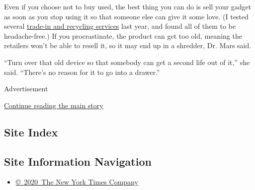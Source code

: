 Even if you choose not to buy used, the best thing you can do is sell
your gadget as soon as you stop using it so that someone else can give
it some love. (I tested several
\href{https://www.google.com/webhp?sourceid=chrome-instant\&ion=1\&espv=2\&ie=UTF-8\#q=brian\%20chen\%20used\%20electronics}{trade-in
and recycling services} last year, and found all of them to be
headache-free.) If you procrastinate, the product can get too old,
meaning the retailers won't be able to resell it, so it may end up in a
shredder, Dr. Mars said.

``Turn over that old device so that somebody can get a second life out
of it,'' she said. ``There's no reason for it to go into a drawer.''

Advertisement

\protect\hyperlink{after-bottom}{Continue reading the main story}

\hypertarget{site-index}{%
\subsection{Site Index}\label{site-index}}

\hypertarget{site-information-navigation}{%
\subsection{Site Information
Navigation}\label{site-information-navigation}}

\begin{itemize}
\tightlist
\item
  \href{https://help.nytimes3xbfgragh.onion/hc/en-us/articles/115014792127-Copyright-notice}{©~2020~The
  New York Times Company}
\end{itemize}

